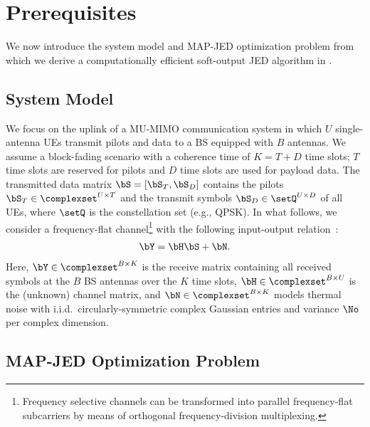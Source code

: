 \section{Prerequisites}

We now introduce the system model and MAP-JED optimization problem from which we derive a computationally efficient soft-output JED algorithm in .

\subsection{System Model}\label{sec:system model}
 
We focus on the uplink of a MU-MIMO communication system in which  $U$ single-antenna UEs transmit pilots and data to a BS equipped with $B$ antennas.
%
We assume a block-fading scenario with a coherence time of $K=T+D$ time slots; $T$ time slots are reserved for pilots and $D$ time slots are used for payload data.
%
The transmitted data matrix $\bS=[\bS_T,\bS_D]$ contains the pilots $\bS_T\in\complexset^{U\times T}$  and the transmit symbols $\bS_D\in\setQ^{U\times D}$ of all UEs, where $\setQ$ is the constellation set  (e.g., QPSK). 
%
In what follows, we consider a frequency-flat channel\footnote{Frequency selective channels can be transformed into parallel frequency-flat subcarriers by means of orthogonal frequency-division multiplexing.} with the following input-output relation~\cite{gesbert2003theory}:
\begin{align}\label{eq:mimo model}
\bY = \bH\bS + \bN.
\end{align} 
Here, $\bY \in \complexset^{B\times K}$ is the receive matrix containing all received symbols at the $B$ BS antennas over the $K$ time slots, $\bH\in\complexset^{B\times U}$ is the (unknown) channel matrix, and $\bN\in\complexset^{B\times K}$ models thermal noise with i.i.d.\ circularly-symmetric complex Gaussian entries and variance $\No$ per complex dimension.

%
%
%
\subsection{MAP-JED Optimization Problem}
 
